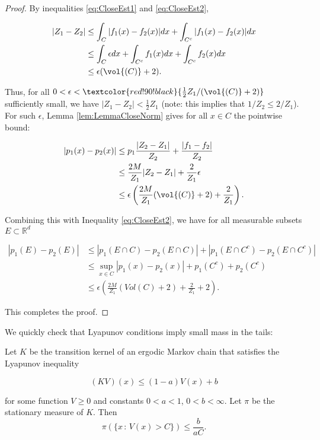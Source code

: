\begin{proof}
By inequalities \eqref{eq:CloseEst1} and \eqref{eq:CloseEst2},

\begin{align*}
\vert Z_{1} - Z_{2} \vert &\leq \int_{C} \vert f_{1}(x) - f_{2}(x) \vert dx + \int_{C^{c}} \vert f_{1}(x) - f_{2}(x) \vert dx \\
&\leq \int_{C} \epsilon dx + \int_{C^{c}} f_{1}(x) dx + \int_{C^{c}} f_{2}(x) dx \\
&\leq \epsilon(\vol{(C)} + 2).
\end{align*}

\noindent Thus, for all $0 < \epsilon < \textcolor{red!90!black}{\frac{1}{2} Z_{1} / (\vol{(C)} + 2)}$ sufficiently small, we have $\vert Z_{1} - Z_{2} \vert < \frac{1}{2} Z_{1}$ \textcolor{blue!90!black}{(note: this implies that $1/Z_{2} \leq 2/Z_{1}$)}. For such $\epsilon$, Lemma \ref{lem:LemmaCloseNorm} gives for all $x \in C$ the pointwise bound:

\begin{align*}
\vert p_{1}(x) - p_{2}(x) \vert &\leq  p_1 \frac{\vert Z_2 - Z_1 \vert}{Z_2}  + \frac{\vert f_1 - f_2\vert }{Z_2} \\
&\leq \frac{2M}{Z_{1}} |Z_{2} - Z_{1}| + \frac{2}{Z_{1}} \epsilon \\
&\leq \epsilon \left( \frac{2M}{Z_{1}}(\vol{(C)} + 2) + \frac{2}{Z_{1}} \right).
\end{align*}

\noindent Combining this with Inequality \eqref{eq:CloseEst2}, we have for all measurable subsets $E \subset \mathbb{R}^{d}$

\begin{align*}
|p_{1}(E) - p_{2}(E)| &\leq |p_{1}(E \cap C) - p_{2}(E \cap C)| + |p_{1}(E \cap C^{c}) - p_{2}(E \cap C^{c})| \\
&\leq \sup_{x \in C} |p_{1}(x) - p_{2}(x)| + p_{1}(C^{c}) + p_{2}(C^{c}) \\
&\leq \epsilon  \left( \frac{2M}{Z_{1}}(Vol(C) + 2) + \frac{2}{Z_{1}}  + 2 \right).
\end{align*}

\noindent This completes the proof.

\end{proof}

We quickly check that Lyapunov conditions imply small mass in the tails:

\begin{lemma}
Let $K$ be the transition kernel of an ergodic Markov chain that satisfies the  Lyapunov inequality

\begin{equation}
  (KV)(x) \leq (1-a) V(x) + b
  \label{eq:IneqLyapSimp}
\end{equation}

\noindent for some function $V \geq 0$ and constants $0 < a < 1$, $0 < b < \infty$. Let $\pi$ be the stationary measure of $K$. Then $$\pi(\{x \, : \, V(x) > C\}) \leq \frac{b}{aC}.$$
\end{lemma}

